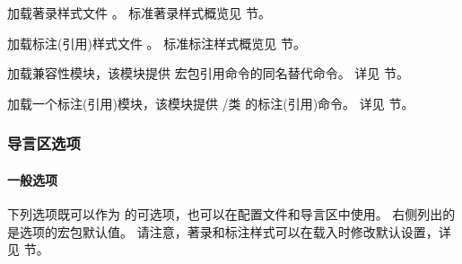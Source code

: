 \begin{optionlist}
加载著录样式文件 。
标准著录样式概览见  节。



加载标注(引用)样式文件 。
标准标注样式概览见  节。



加载兼容性模块，该模块提供  宏包引用命令的同名替代命令。
详见  节。



加载一个标注(引用)模块，该模块提供 \slash 类  的标注(引用)命令。
详见  节。

\end{optionlist}

\subsubsection{导言区选项}
\label{use:opt:pre}

\paragraph{一般选项}
\label{use:opt:pre:gen}


下列选项既可以作为  的可选项，也可以在配置文件和导言区中使用。
右侧列出的是选项的宏包默认值。
请注意，著录和标注样式可以在载入时修改默认设置，详见  节。

